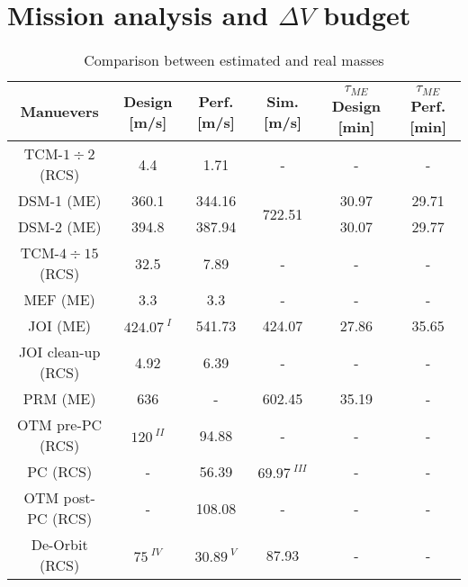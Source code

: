 \section{Mission analysis and \texorpdfstring{$\Delta V$}{Delta-V} budget}
\label{sec:ma_and_dv}

\begin{table}[H]
    \renewcommand{\arraystretch}{1.3}
    \centering
    \begin{tabular}{|c|c|c|c|c|c|}
        \hline
        \textbf{Manuevers} & \textbf{Design} [m/s] & \textbf{Perf.} [m/s] & \textbf{Sim.} [m/s] & \textbf{$\tau_{ME}$ Design} [min] & \textbf{$\tau_{ME}$ Perf.} [min]  \\
        \hline
        TCM\cite{junno_inner}-$1\div2$ (RCS) & 4.4 & 1.71 & - & - & - \\
        \hline 
        \multicolumn{1}{|c|}{DSM\cite{junno_inner}-1 (ME)} & \multicolumn{1}{c|}{360.1} & \multicolumn{1}{c|}{344.16} & \multirow{2}{*}{722.51} & \multicolumn{1}{c|}{30.97} & \multicolumn{1}{c|}{29.71} \\
        \cline{1-3}
        \cline{5-6}
        \multicolumn{1}{|c|}{DSM\cite{junno_inner}-2 (ME)} & \multicolumn{1}{c|}{394.8} & \multicolumn{1}{c|}{387.94} & & \multicolumn{1}{c|}{30.07} & \multicolumn{1}{c|}{29.77} \\
        \hline
        TCM\cite{junno_inner}-$4\div15$ (RCS) & 32.5 & 7.89 & - & - & - \\
        \hline
        MEF\cite{junno_inner} (ME) & 3.3 & 3.3 & - & - & - \\
        \hline
        JOI\cite{otm} (ME) & $424.07^{\;I}$ & 541.73 & 424.07 & 27.86 & 35.65 \\
        \hline 
        JOI\cite{otm} clean-up (RCS) & 4.92 & 6.39 & - & - & - \\
        \hline
        PRM\cite{otm} (ME) & 636 & - & 602.45 & 35.19 & - \\
        \hline
        OTM\cite{nasa_otm} pre-PC (RCS) & $120^{\;II}$ & 94.88 & - & - & - \\
        \hline 
        PC (RCS) & - & 56.39 & $69.97^{\;III}$ & - & - \\
        \hline
        OTM post-PC (RCS) & - & 108.08 & - & - & - \\
        \hline
        De-Orbit\cite{spaceflight101} (RCS) & $75^{\;IV}$ & $30.89^{\;V} $& 87.93 & - & -\\
        \hline
    \end{tabular}
    \caption{Comparison between estimated and real masses}
    \label{table:masses}
\end{table}

